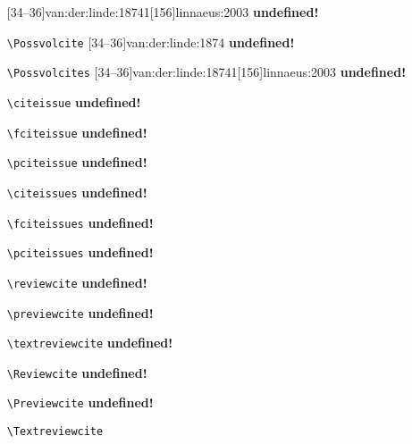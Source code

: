 \documentclass[a4paper,12pt]{scrartcl}
\newcommand*{\Befehl}[1]{\texttt{\textbackslash#1}}
\begin{document}
\begin{enumerate}
        {[34--36]{van:der:linde:1874}{1}[156]{linnaeus:2003}}
        {\textbf{undefined!}}%
    \item[\footnotesize\Befehl{Possvolcite}] 
        {[34--36]{van:der:linde:1874}}
        {\textbf{undefined!}}%
    \item[\footnotesize\Befehl{Possvolcites}] 
        {[34--36]{van:der:linde:1874}{1}[156]{linnaeus:2003}}
        {\textbf{undefined!}}%
	\item[\footnotesize\Befehl{citeissue}] 
        {}
        {\textbf{undefined!}}%
	\item[\footnotesize\Befehl{fciteissue}] 
        {}
        {\textbf{undefined!}}%
	\item[\footnotesize\Befehl{pciteissue}] 
        {}
        {\textbf{undefined!}}%
	\item[\footnotesize\Befehl{citeissues}] 
        {}
        {\textbf{undefined!}}%
	\item[\footnotesize\Befehl{fciteissues}] 
        {}
        {\textbf{undefined!}}%
	\item[\footnotesize\Befehl{pciteissues}] 
        {}
        {\textbf{undefined!}}%
	\item[\footnotesize\Befehl{reviewcite}] 
        {}
        {\textbf{undefined!}}%
	\item[\footnotesize\Befehl{previewcite}] 
        {}
        {\textbf{undefined!}}%
	\item[\footnotesize\Befehl{textreviewcite}] 
        {}
        {\textbf{undefined!}}%
	\item[\footnotesize\Befehl{Reviewcite}] 
        {}
        {\textbf{undefined!}}%
	\item[\footnotesize\Befehl{Previewcite}] 
        {}
        {\textbf{undefined!}}%
	\item[\footnotesize\Befehl{Textreviewcite}] 
        {}

\end{enumerate}
\end{document}
